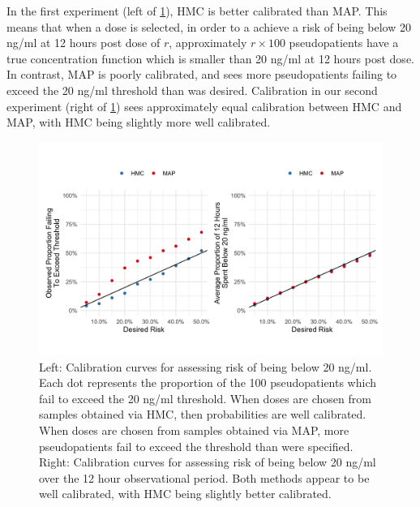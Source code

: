In the first experiment (left of \cref{fig:fig8}), HMC is better calibrated than MAP.  This means that when a dose is selected, in order to a achieve a risk of being below 20 ng/ml at 12 hours post dose of $r$, approximately $r \times 100$ pseudopatients have a true concentration function which is smaller than 20 ng/ml at 12 hours post dose. In contrast, MAP is poorly calibrated, and sees more pseudopatients failing to exceed the 20 ng/ml threshold than was desired.  Calibration in our second experiment (right of \cref{fig:fig8}) sees approximately equal calibration between HMC and MAP, with HMC being slightly more well calibrated. 
\begin{figure}
	\centering
	\includegraphics[width=\linewidth]{figs/fig8.png}
	\caption{Left: Calibration curves for assessing risk of being below 20 ng/ml.  Each dot represents the proportion of the 100 pseudopatients which fail to exceed the 20 ng/ml threshold.  When doses are chosen from samples obtained via HMC, then probabilities are well calibrated. When doses are chosen from samples obtained via MAP, more pseudopatients fail to exceed the threshold than were specified.  Right: Calibration curves for assessing risk of being below 20 ng/ml over the 12 hour observational period.  Both methods appear to be well calibrated, with HMC being slightly better calibrated.}
	\label{fig:fig8}
\end{figure}



